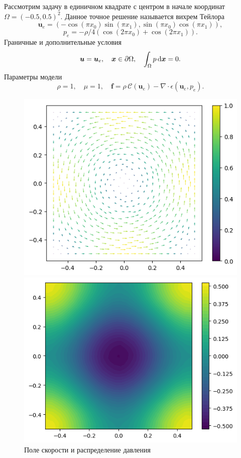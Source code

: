 \documentclass[a4paper,10pt]{report}
\begin{document}
Рассмотрим задачу в единичном квадрате с центром в начале координат $\Omega = (-0.5, 0.5)^2$. Данное точное решение называется вихрем Тейлора 
\[
    \bm{u}_e = \left(-\cos(\pi x_0) \sin(\pi x_1), \sin(\pi x_0) \cos(\pi x_1)\right),
\]
\[
    p_e = -\rho/4 (\cos(2 \pi x_0) + \cos(2 \pi x_1)).
\]
Граничные и дополнительные условия
\[
    \bm{u} = \bm{u}_e, \quad \bm{x} \in \partial \Omega, \quad \int_\Omega p \,{\rm d}\bm{x} = 0.
\]
Параметры модели 
\[
    \rho=1, \quad \mu = 1, \quad \bm{f}=\rho \,\mathcal{C}(\bm{u}_e) - \nabla \cdot \epsilon(\bm{u}_e, p_e).
\]

\begin{figure}[H]
    \begin{minipage}{0.49\linewidth}
        \includegraphics[height=0.75\linewidth]{taylorvortex/u.png}
    \end{minipage}
    \begin{minipage}{0.49\linewidth}
        \includegraphics[height=0.75\linewidth]{taylorvortex/p.png}
    \end{minipage}
    \label{fig:taylorvortex}
    \caption{Поле скорости и распределение давления}
\end{figure}
    
\end{document}
